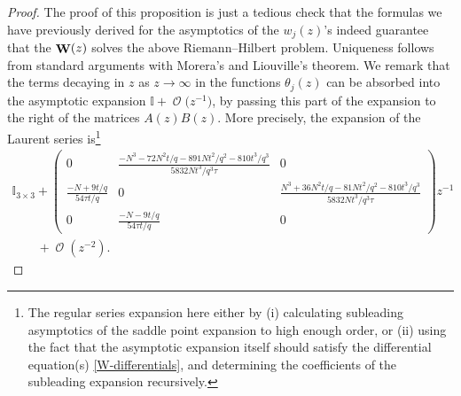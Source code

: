 \documentclass[10pt,a4paper]{amsart}
\DeclareMathOperator{\OO}{\mathcal{O}}
\DeclareMathOperator{\WW}{{\bf W}}
\numberwithin{equation}{section}
\begin{document}
\begin{proof}
 The proof of this proposition is just a tedious check that the formulas we have previously derived for the asymptotics of the $w_j(z)$'s indeed guarantee that the $\WW(z)$ solves the above Riemann--Hilbert problem. Uniqueness follows from standard arguments with Morera's and Liouville's theorem. We remark that the terms decaying in $z$ as $z\to \infty$ in the functions $\theta_j(z)$ can be absorbed into the asymptotic expansion $\mathbb{I} + \OO\bigl(z^{-1}\bigr)$, by passing this part of the expansion to the right of the matrices $A(z) B(z)$. More precisely, the expansion of the Laurent series is\footnote{The regular series expansion here either by (i) calculating subleading asymptotics of the saddle point expansion to high enough order, or (ii) using the fact that the asymptotic expansion itself should satisfy the differential equation(s) \eqref{W-differentials}, and determining the coefficients
 of the subleading expansion recursively.}
 \begin{gather*}
 \mathbb{I}_{3\times 3} +
 \begin{pmatrix}
 0 & \frac{-N^3 - 72N^2t/q - 891 N t^2/q^2 - 810 t^3/q^3}{5832 N t^3/q^3\tau} & 0\\
			\frac{-N+9t/q}{54\tau t/q} & 0 & \frac{N^3 + 36 N^2 t/q - 81 N t^2/q^2 - 810 t^3/q^3}{5832 N t^3/q^3\tau}\\
			0 & \frac{-N-9t/q}{54\tau t/q} & 0
 \end{pmatrix}z^{-1}\\
 \qquad{} + \OO(z^{-2}).
\tag*{\qed}
\end{gather*}
\renewcommand{\qed}{}
\end{proof}
\end{document}

